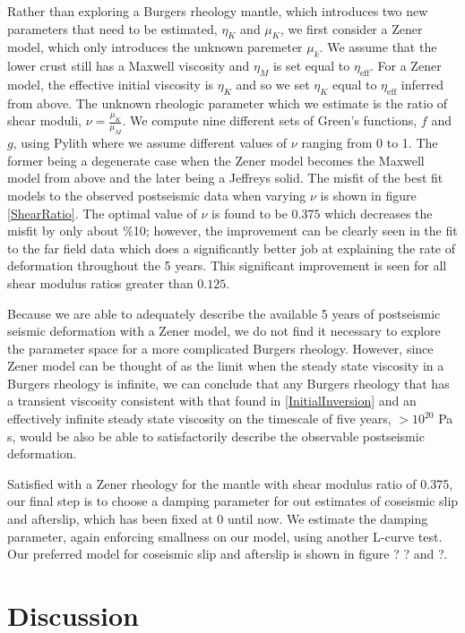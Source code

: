 \documentclass[12pt]{article}
\begin{document}
Rather than exploring a Burgers rheology mantle, which introduces two new parameters that need to be estimated, $\eta_{K}$ and $\mu_{K}$, we first consider a Zener model, which only introduces the unknown paremeter $\mu_{k}$.  We assume that the lower crust still has a Maxwell viscosity and $\eta_{M}$ is set equal to $\eta_{\mathrm{eff}}$. For a Zener model, the effective initial viscosity is $\eta_{K}$ and so we set $\eta_K$ equal to $\eta_{\mathrm{eff}}$ inferred from above.  The unknown rheologic parameter which we estimate is the ratio of shear moduli, $\nu=\frac{\mu_K}{\mu_M}$. We compute nine different sets of Green's functions, $f$ and $g$, using Pylith where we assume different values of $\nu$ ranging from 0 to 1. The former being a degenerate case when the Zener model becomes the Maxwell model from above and the later being a Jeffreys solid.  The misfit of the best fit models to the observed postseismic data when varying $\nu$ is shown in figure \ref{ShearRatio}. The optimal value of $\nu$ is found to be $0.375$ which decreases the misfit by only about \%10; however, the improvement can be clearly seen in the fit to the far field data which does a significantly better job at explaining the rate of deformation throughout the 5 years.  This significant improvement is seen for all shear modulus  ratios greater than $0.125$. 

Because we are able to adequately  describe the available 5 years of postseismic seismic deformation with a Zener model, we do not find it necessary to explore the parameter space for a more complicated Burgers rheology.  However, since Zener model can be thought of as the limit when the steady state viscosity in a Burgers rheology is infinite, we can conclude that any Burgers rheology that has a transient viscosity consistent with that found in \ref{InitialInversion} and an effectively infinite steady state viscosity on the timescale of five years, $>10^{20}$ Pa s, would be also be able to satisfactorily describe the observable postseismic deformation.        

Satisfied with a Zener rheology for the mantle with shear modulus ratio of 0.375, our final step is to choose a damping parameter for out estimates of coseismic slip and afterslip, which has been fixed at 0 until now.  We estimate the damping parameter, again enforcing smallness on our model, using another L-curve test.  Our preferred model for coseismic slip and afterslip is shown in figure ? ? and ?. 

  
\section{Discussion}
\end{document}
